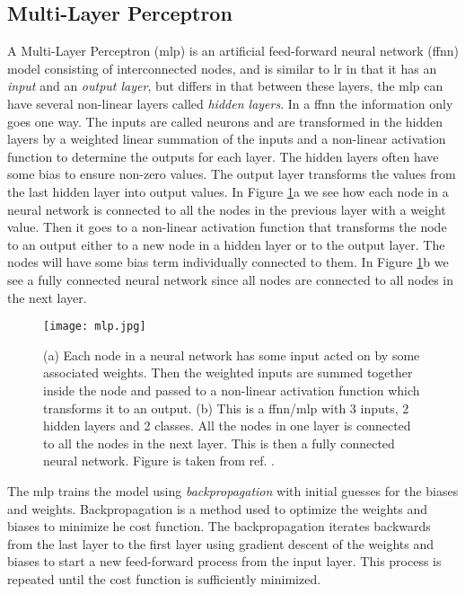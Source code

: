 \documentclass[a4paper, american, 12pt]{report}
\begin{document}
	\subsection{Multi-Layer Perceptron}
	\label{subsect:Theory-MLP}
	A Multi-Layer Perceptron (\acrshort{mlp})\cite{MLP} is an artificial feed-forward neural network (\acrshort{ffnn}) model consisting of interconnected nodes, and is similar to \acrshort{lr} in that it has an \textit{input} and an \textit{output layer}, but differs in that between these layers, the \acrshort{mlp} can have several non-linear layers called \textit{hidden layers}. In a \acrshort{ffnn} the information only goes one way. The inputs are called neurons and are transformed in the hidden layers by a weighted linear summation of the inputs and a non-linear activation function to determine the outputs for each layer. The hidden layers often have some bias to ensure non-zero values. The output layer transforms the values from the last hidden layer into output values. In Figure \ref{fig:MLP}a we see how each node in a neural network is connected to all the nodes in the previous layer with a weight value. Then it goes to a non-linear activation function that transforms the node to an output either to a new node in a hidden layer or to the output layer. The nodes will have some bias term individually connected to them. In Figure \ref{fig:MLP}b we see a fully connected neural network since all nodes are connected to all nodes in the next layer.
	\begin{figure}[ht!]
		\hspace*{-1.0cm}
		\centering\texttt{[image: mlp.jpg]}
		\caption[Multi-Layer Perceptron illustration.]{(a) Each node in a neural network has some input acted on by some associated weights. Then the weighted inputs are summed together inside the node and passed to a non-linear activation function which transforms it to an output. (b) This is a \acrshort{ffnn}/\acrshort{mlp} with 3 inputs, 2 hidden layers and 2 classes. All the nodes in one layer is connected to all the nodes in the next layer. This is then a fully connected neural network. Figure is taken from ref. \citet{MLP_network}. \label{fig:MLP}}
	\end{figure}
	
	The \acrshort{mlp} trains the model using \textit{backpropagation} with initial guesses for the biases and weights. Backpropagation is a method used to optimize the weights and biases to minimize he cost function. The backpropagation iterates backwards from the last layer to the first layer using gradient descent of the weights and biases to start a new feed-forward process from the input layer. This process is repeated until the cost function is sufficiently minimized. 
	
\end{document}
